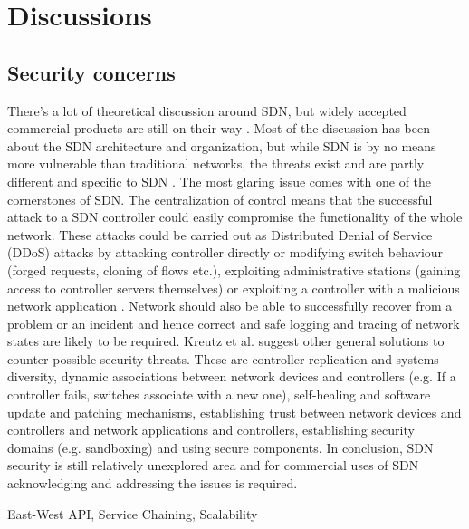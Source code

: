 \section{Discussions}

\subsection{Security concerns}

There’s a lot of theoretical discussion around SDN, but widely accepted commercial products are still on their way \cite{Sorensen12}. Most of the discussion has been about the SDN architecture and organization, but while SDN is by no means more vulnerable than traditional networks, the threats exist and are partly different and specific to SDN \cite{Kreutz13}. The most glaring issue comes with one of the cornerstones of SDN. The centralization of control means that the successful attack to a SDN controller could easily compromise the functionality of the whole network. These attacks could be carried out as Distributed Denial of Service (DDoS) attacks by attacking controller directly or modifying switch behaviour (forged requests, cloning of flows etc.), exploiting administrative stations (gaining access to controller servers themselves) or exploiting a controller with a malicious network application  \cite{Kreutz13}. Network should also be able to successfully recover from a problem or an incident and hence correct and safe logging and tracing of network states are likely to be required.
Kreutz et al. suggest other general solutions to counter possible security threats. These are controller replication and systems diversity, dynamic associations between network devices and controllers (e.g. If a controller fails, switches associate with a new one), self-healing and software update and patching mechanisms, establishing trust between network devices and controllers and network applications and controllers, establishing security domains (e.g. sandboxing) and using secure components. In conclusion, SDN security is still relatively unexplored area and for commercial uses of SDN acknowledging and addressing the issues is required.


East-West API, Service Chaining, Scalability
